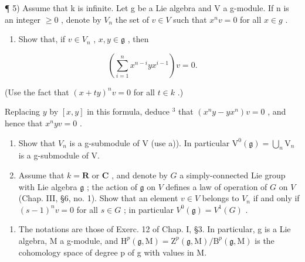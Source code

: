 ¶ 5) Assume that k is infinite. Let g be a Lie algebra and V a g-module. If n is an integer \(\geq 0\) , denote by \(V_{n}\) the set of \(v \in V\) such that \(x^{n}v = 0\) for all \(x \in g\) .

\begin{enumerate}
\def\labelenumi{\alph{enumi})}
\tightlist
\item
  Show that, if \(v \in V_n\) , \(x, y \in \mathfrak{g}\) , then
\end{enumerate}

\[
\left(\sum_ {i = 1} ^ {n} x ^ {n - i} y x ^ {i - 1}\right) v = 0.
\]

(Use the fact that \((x + ty)^n v = 0\) for all \(t\in k\) .)

Replacing \(y\) by \([x, y]\) in this formula, deduce \(^3\) that \((x^n y - y x^n)v = 0\) , and hence that \(x^n y v = 0\) .

\begin{enumerate}
\def\labelenumi{\alph{enumi})}
\setcounter{enumi}{1}
\item
  Show that \(V_{n}\) is a g-submodule of V (use a)). In particular \(\mathrm{V}^{0}(\mathfrak{g})=\bigcup_{n}\mathrm{V}_{n}\) is a g-submodule of V.
\item
  Assume that \(k = \mathbf{R}\) or \(\mathbf{C}\) , and denote by \(G\) a simply-connected Lie group with Lie algebra \(\mathfrak{g}\) ; the action of \(\mathfrak{g}\) on \(V\) defines a law of operation of \(G\) on \(V\) (Chap. III, §6, no. 1). Show that an element \(v \in V\) belongs to \(V_n\) if and only if \((s - 1)^n v = 0\) for all \(s \in G\) ; in particular \(V^0(\mathfrak{g}) = V^1(G)\) .
\end{enumerate}

\begin{enumerate}
\def\labelenumi{\arabic{enumi})}
\setcounter{enumi}{5}
\tightlist
\item
  The notations are those of Exerc. 12 of Chap. I, §3. In particular, g is a Lie algebra, M a g-module, and \(\mathrm{H}^{p}(\mathfrak{g},\mathrm{M})=\mathrm{Z}^{p}(\mathfrak{g},\mathrm{M})/\mathrm{B}^{p}(\mathfrak{g},\mathrm{M})\) is the cohomology space of degree p of g with values in M.
\end{enumerate}

